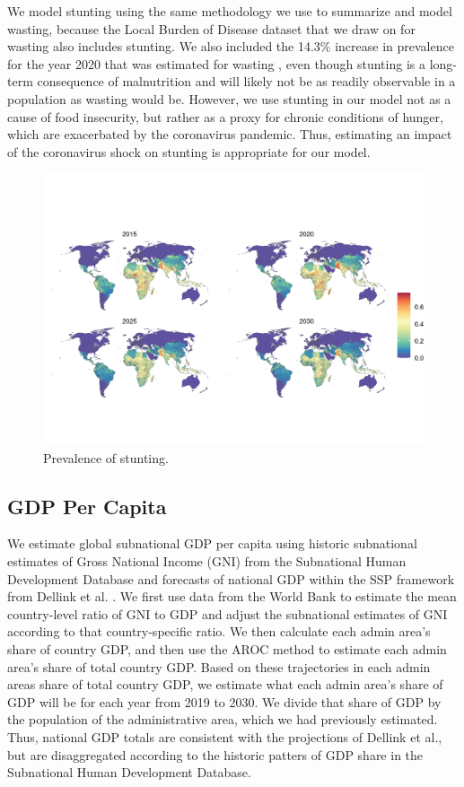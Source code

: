 \documentclass{article}
\begin{document}
We model stunting using the same methodology we use to summarize and model wasting, because the Local Burden of Disease dataset that we draw on for wasting also includes stunting.  We also included the 14.3\% increase in prevalence for the year 2020 that was estimated for wasting \citep{headey2020impacts}, even though stunting is a long-term consequence of malnutrition and will likely not be as readily observable in a population as wasting would be.  However, we use stunting in our model not as a cause of food insecurity, but rather as a proxy for chronic conditions of hunger, which are exacerbated by the coronavirus pandemic.  Thus, estimating an impact of the coronavirus shock on stunting is appropriate for our model.

\begin{figure}[H]
  \centering
  \includegraphics[width=\linewidth]{img/covars/stunting.png}
  \caption{Prevalence of stunting.}
\end{figure}

\subsection{GDP Per Capita}
We estimate global subnational GDP per capita using historic subnational estimates of Gross National Income (GNI) from the Subnational Human Development Database \cite{Smits2019} and forecasts of national GDP within the SSP framework from Dellink et al. \cite{Dellink2017}.  We first use data from the World Bank to estimate the mean country-level ratio of GNI to GDP and adjust the subnational estimates of GNI according to that country-specific ratio.  We then calculate each admin area's share of country GDP, and then use the AROC method to estimate each admin area's share of total country GDP.  Based on these trajectories in each admin areas share of total country GDP, we estimate what each admin area's share of GDP will be for each year from 2019 to 2030.  We divide that share of GDP by the population of the administrative area, which we had previously estimated.  Thus, national GDP totals are consistent with the projections of Dellink et al., but are disaggregated according to the historic patters of GDP share in the Subnational Human Development Database.
\end{document}
